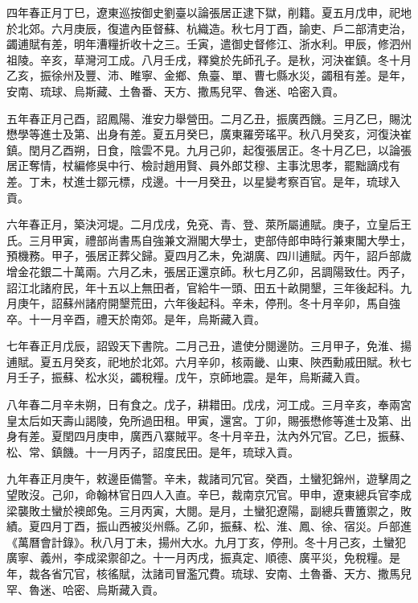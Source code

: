 \begin{pinyinscope}
四年春正月丁巳，遼東巡按御史劉臺以論張居正逮下獄，削籍。夏五月戊申，祀地於北郊。六月庚辰，復遣內臣督蘇、杭織造。秋七月丁酉，諭吏、戶二部清吏治，蠲逋賦有差，明年漕糧折收十之三。壬寅，遣御史督修江、浙水利。甲辰，修泗州祖陵。辛亥，草灣河工成。八月壬戌，釋奠於先師孔子。是秋，河決崔鎮。冬十月乙亥，振徐州及豐、沛、睢寧、金鄉、魚臺、單、曹七縣水災，蠲租有差。是年，安南、琉球、烏斯藏、土魯番、天方、撒馬兒罕、魯迷、哈密入貢。

五年春正月己酉，詔鳳陽、淮安力舉營田。二月乙丑，振廣西饑。三月乙巳，賜沈懋學等進士及第、出身有差。夏五月癸巳，廣東羅旁瑤平。秋八月癸亥，河復決崔鎮。閏月乙酉朔，日食，陰雲不見。九月己卯，起復張居正。冬十月乙巳，以論張居正奪情，杖編修吳中行、檢討趙用賢、員外郎艾穆、主事沈思孝，罷黜謫戍有差。丁未，杖進士鄒元標，戍邊。十一月癸丑，以星變考察百官。是年，琉球入貢。

六年春正月，築決河堤。二月戊戌，免兗、青、登、萊所屬逋賦。庚子，立皇后王氏。三月甲寅，禮部尚書馬自強兼文淵閣大學士，吏部侍郎申時行兼東閣大學士，預機務。甲子，張居正葬父歸。夏四月乙未，免湖廣、四川逋賦。丙午，詔戶部歲增金花銀二十萬兩。六月乙未，張居正還京師。秋七月乙卯，呂調陽致仕。丙子，詔江北諸府民，年十五以上無田者，官給牛一頭、田五十畝開墾，三年後起科。九月庚午，詔蘇州諸府開墾荒田，六年後起科。辛未，停刑。冬十月辛卯，馬自強卒。十一月辛酉，禮天於南郊。是年，烏斯藏入貢。

七年春正月戊辰，詔毀天下書院。二月己丑，遣使分閱邊防。三月甲子，免淮、揚逋賦。夏五月癸亥，祀地於北郊。六月辛卯，核兩畿、山東、陜西勳戚田賦。秋七月壬子，振蘇、松水災，蠲稅糧。戊午，京師地震。是年，烏斯藏入貢。

八年春二月辛未朔，日有食之。戊子，耕耤田。戊戌，河工成。三月辛亥，奉兩宮皇太后如天壽山謁陵，免所過田租。甲寅，還宮。丁卯，賜張懋修等進士及第、出身有差。夏閏四月庚申，廣西八寨賊平。冬十月辛丑，汰內外冗官。乙巳，振蘇、松、常、鎮饑。十一月丙子，詔度民田。是年，琉球入貢。

九年春正月庚午，敕邊臣備警。辛未，裁諸司冗官。癸酉，土蠻犯錦州，遊擊周之望敗沒。己卯，命翰林官日四人入直。辛巳，裁南京冗官。甲申，遼東總兵官李成梁襲敗土蠻於襖郎兔。三月丙寅，大閱。是月，土蠻犯遼陽，副總兵曹簠禦之，敗績。夏四月丁酉，振山西被災州縣。乙卯，振蘇、松、淮、鳳、徐、宿災。戶部進《萬曆會計錄》。秋八月丁未，揚州大水。九月丁亥，停刑。冬十月己亥，土蠻犯廣寧、義州，李成梁禦卻之。十一月丙戌，振真定、順德、廣平災，免稅糧。是年，裁各省冗官，核徭賦，汰諸司冒濫冗費。琉球、安南、土魯番、天方、撒馬兒罕、魯迷、哈密、烏斯藏入貢。


\end{pinyinscope}
